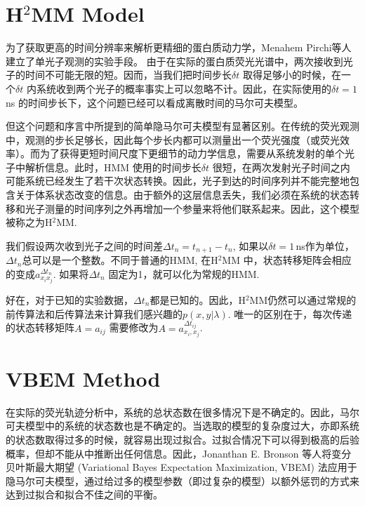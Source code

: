 \documentclass[11pt, a4paper]{article}
\begin{document}
\section{H$^2$MM Model}\label{chapter:H2MM}

    为了获取更高的时间分辨率来解析更精细的蛋白质动力学，Menahem Pirchi等人建立了单光子观测的实验手段\cite{H2MM}。 由于在实际的蛋白质荧光光谱中，两次接收到光子的时间不可能无限的短。因而，当我们把时间步长$\delta t$ 取得足够小的时候，在一个$\delta t$ 内系统收到两个光子的概率事实上可以忽略不计。因此，在实际使用的$\delta t = 1\,$ns 的时间步长下，这个问题已经可以看成离散时间的马尔可夫模型。

    但这个问题和序言中所提到的简单隐马尔可夫模型有显著区别。在传统的荧光观测中，观测的步长足够长，因此每个步长内都可以测量出一个荧光强度（或荧光效率）。而为了获得更短时间尺度下更细节的动力学信息，需要从系统发射的单个光子中解析信息。此时，HMM 使用的时间步长$\delta t$ 很短，在两次发射光子时间之内可能系统已经发生了若干次状态转换。因此，光子到达的时间序列并不能完整地包含关于体系状态改变的信息。由于额外的这层信息丢失，我们必须在系统的状态转移和光子测量的时间序列之外再增加一个参量来将他们联系起来。因此，这个模型被称之为H$^2$MM.

    我们假设两次收到光子之间的时间差$\Delta t_n = t_{n+1}-t_n$, 如果以$\delta t=1\,$ns作为单位，$\Delta t_n$总可以是一个整数。不同于普通的HMM, 在H$^2$MM 中，状态转移矩阵会相应的变成$a_{x_ix_j}^{\Delta t_n}$. 如果将$\Delta t_n$ 固定为1，就可以化为常规的HMM.

    好在，对于已知的实验数据，$\Delta t_n$都是已知的。因此，H$^2$MM仍然可以通过常规的前传算法和后传算法来计算我们感兴趣的$p(x,y|\lambda)$. 唯一的区别在于，每次传递的状态转移矩阵$A=a_{ij}$ 需要修改为$A=a^{\Delta t_{ij}}_{x_i, x_j}$.







\section{VBEM Method}\label{chapter:VBEM}

    在实际的荧光轨迹分析中，系统的总状态数在很多情况下是不确定的。因此，马尔可夫模型中的系统的状态数也是不确定的。当选取的模型的复杂度过大，亦即系统的状态数取得过多的时候，就容易出现过拟合。过拟合情况下可以得到极高的后验概率，但却不能从中推断出任何信息。因此，Jonanthan E. Bronson 等人将变分贝叶斯最大期望 (Variational Bayes Expectation Maximization, VBEM) 法应用于隐马尔可夫模型\cite{VBEM}，通过给过多的模型参数（即过复杂的模型）以额外惩罚的方式来达到过拟合和拟合不佳之间的平衡。
\end{document}
